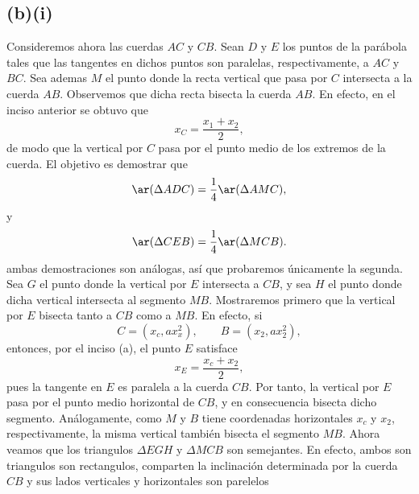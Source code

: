 \documentclass[12pt,a4paper]{article}
\begin{document}
\begin{solucion}
        \subsection*{(b)(i)}
        Consideremos ahora las cuerdas $AC$ y $CB$. Sean $D$ y $E$ los puntos de la parábola
        tales que las tangentes en dichos puntos son paralelas, respectivamente, a $AC$ y
        $BC$. Sea ademas $M$ el punto donde la recta vertical que pasa por $C$ intersecta
        a la cuerda $AB$. Observemos que dicha recta bisecta la cuerda $AB$. En efecto,
        en el inciso anterior se obtuvo que
        \begin{equation*}
            x_{C}=\frac{x_{1}+x_{2}}{2},
        \end{equation*}
        de modo que la vertical por $C$ pasa por el punto medio de los extremos de la cuerda.
        El objetivo es demostrar que
        \begin{equation*}
            \ar(\Delta ADC)=\frac{1}{4}\ar(\Delta AMC),
        \end{equation*}
        y
        \begin{equation*}
            \ar(\Delta CEB)=\frac{1}{4}\ar(\Delta MCB).
        \end{equation*}
        ambas demostraciones son análogas, así que probaremos únicamente
        la segunda. Sea $G$ el punto donde la vertical por $E$ intersecta
        a $CB$, y sea $H$ el punto donde dicha vertical intersecta al segmento
        $MB$. Mostraremos primero que la vertical por $E$ bisecta tanto a $CB$ como a $MB$.
        En efecto, si
        \begin{equation*}
            C=(x_{c},ax_{x}^{2}),\qquad B=(x_{2},ax_{2}^{2}),
        \end{equation*}
        entonces, por el inciso (a), el punto $E$ satisface
        \begin{equation*}
            x_{E}=\frac{x_{c}+x_{2}}{2},
        \end{equation*}
        pues la tangente en $E$ es paralela a la cuerda $CB$. Por tanto, la vertical
        por $E$ pasa por el punto medio horizontal de $CB$, y en consecuencia bisecta
        dicho segmento. Análogamente, como $M$ y $B$ tiene coordenadas horizontales
        $x_{c}$ y $x_{2}$, respectivamente, la misma vertical también bisecta el
        segmento $MB$. Ahora veamos que los triangulos $\Delta EGH$ y $\Delta MCB$
        son semejantes. En efecto, ambos son triangulos son rectangulos, comparten la inclinación
        determinada por la cuerda $CB$ y sus lados verticales y horizontales son parelelos

\end{solucion}
\end{document}
